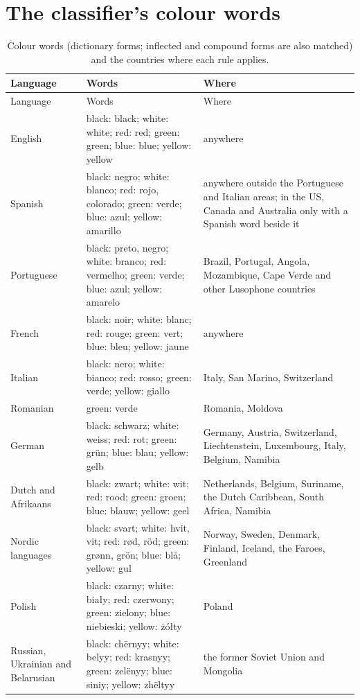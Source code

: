 \documentclass[11pt,a4paper]{article}
\begin{document}
\clearpage
\appendix
\section{The classifier's colour words}
{\footnotesize\setlength{\tabcolsep}{4pt}\begin{longtable}{p{2.6cm}p{6.6cm}p{5.4cm}}\caption{Colour words (dictionary forms; inflected and compound forms are also matched) and the countries where each rule applies.}\label{tab:rules}\\\toprule Language & Words & Where\\\midrule\endfirsthead\toprule Language & Words & Where\\\midrule\endhead
English & black: black; white: white; red: red; green: green; blue: blue; yellow: yellow & anywhere\\
Spanish & black: negro; white: blanco; red: rojo, colorado; green: verde; blue: azul; yellow: amarillo & anywhere outside the Portuguese and Italian areas; in the US, Canada and Australia only with a Spanish word beside it\\
Portuguese & black: preto, negro; white: branco; red: vermelho; green: verde; blue: azul; yellow: amarelo & Brazil, Portugal, Angola, Mozambique, Cape Verde and other Lusophone countries\\
French & black: noir; white: blanc; red: rouge; green: vert; blue: bleu; yellow: jaune & anywhere\\
Italian & black: nero; white: bianco; red: rosso; green: verde; yellow: giallo & Italy, San Marino, Switzerland\\
Romanian & green: verde & Romania, Moldova\\
German & black: schwarz; white: weiss; red: rot; green: grün; blue: blau; yellow: gelb & Germany, Austria, Switzerland, Liechtenstein, Luxembourg, Italy, Belgium, Namibia\\
Dutch and Afrikaans & black: zwart; white: wit; red: rood; green: groen; blue: blauw; yellow: geel & Netherlands, Belgium, Suriname, the Dutch Caribbean, South Africa, Namibia\\
Nordic languages & black: svart; white: hvit, vit; red: rød, röd; green: grønn, grön; blue: blå; yellow: gul & Norway, Sweden, Denmark, Finland, Iceland, the Faroes, Greenland\\
Polish & black: czarny; white: biały; red: czerwony; green: zielony; blue: niebieski; yellow: żółty & Poland\\
Russian, Ukrainian and Belarusian & black: chërnyy; white: belyy; red: krasnyy; green: zelënyy; blue: siniy; yellow: zhëltyy & the former Soviet Union and Mongolia\\

\end{longtable}}
\end{document}
